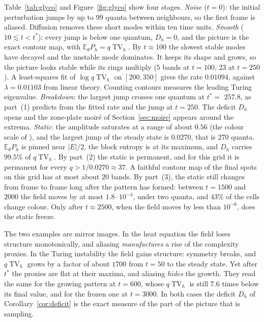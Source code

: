 \documentclass[11pt,a4paper]{article}
\theoremstyle{definition}
\theoremstyle{remark}
\newcommand{\E}{\mathbb{E}}
\newcommand{\TV}{\operatorname{TV}}
\begin{document}
Table~\ref{tab:glyco} and Figure~\ref{fig:glyco} show four stages.
\emph{Noise} ($t=0$): the initial perturbation jumps by up to
$99$ quanta between neighbours, so the first frame is aliased. Diffusion
removes these short modes within ten time units. \emph{Smooth}
($10\lesssim t<t^\ast$): every jump is below one quantum, $D_h=0$, and
the picture is the exact contour map, with $\E_\theta P_h=q\TV_h$. By
$t\approx100$ the slowest stable modes have decayed and the unstable
mode dominates. It keeps its shape and grows, so the picture
looks stable while its rings multiply ($5$ bands at $t=100$, $23$ at
$t=250$). A least-squares fit of $\log q\TV_h$ on $[200,350]$ gives the
rate $0.01094$, against $\lambda=0.01103$ from linear theory. Counting
contours measures the leading Turing eigenvalue. \emph{Breakdown}: the
largest jump crosses one quantum at $t^\ast=$ $257.8$, as part~(1)
predicts from the fitted rate and the jump at $t=250$. The deficit $D_h$
opens and the zone-plate moir\'e of Section~\ref{sec:moire} appears
around the extrema. \emph{Static}: the amplitude saturates at a range of
about $0.56$ (the colour scale of \cite[Fig.~4c]{Glyco}), and the
largest jump of the steady state is $0.0270$, that is $270$ quanta.
$\E_\theta P_h$ is pinned near $|E|/2$, the block entropy is at its
maximum, and $D_h$ carries $99.5\%$ of $q\TV_h$. By part~(2) the
static is permanent, and for this grid it is permanent for every
$q>1/0.0270\approx37$. A faithful contour map of the final spots on
this grid has at most about $20$ bands. By part~(3), the static still
changes from frame to frame long after the pattern has formed: between
$t=1500$ and $2000$ the field moves by at most $1.8\cdot10^{-4}$, under
two quanta, and $43\%$ of the cells change colour. Only after
$t\approx2500$, when the field moves by less than $10^{-6}$, does the
static freeze.

The two examples are mirror images. In the heat equation the field loses
structure monotonically, and aliasing \emph{manufactures} a rise of the
complexity proxies. In the Turing instability the field gains structure:
symmetry breaks, and $q\TV_h$ grows by a factor of about $1700$ from
$t=50$ to the steady state. Yet after $t^\ast$ the proxies are flat at
their maxima, and aliasing \emph{hides} the growth. They read the same
for the growing pattern at $t=600$, whose $q\TV_h$ is still $7.6$ times
below its final value, and for the frozen one at $t=3000$.
In both cases the deficit $D_h$ of Corollary~\ref{cor:deficit} is the
exact measure of the part of the picture that is sampling.
\end{document}
